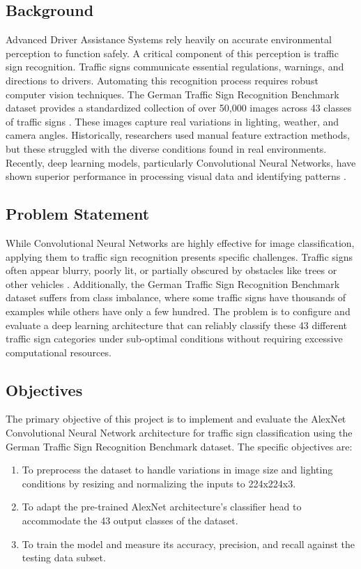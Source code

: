 \documentclass[conference]{IEEEtran}
\begin{document}
\subsection{Background}
Advanced Driver Assistance Systems rely heavily on accurate environmental perception to function safely. A critical component of this perception is traffic sign recognition. Traffic signs communicate essential regulations, warnings, and directions to drivers. Automating this recognition process requires robust computer vision techniques. The German Traffic Sign Recognition Benchmark dataset provides a standardized collection of over 50,000 images across 43 classes of traffic signs \cite{stallkamp2012man}. These images capture real variations in lighting, weather, and camera angles. Historically, researchers used manual feature extraction methods, but these struggled with the diverse conditions found in real environments. Recently, deep learning models, particularly Convolutional Neural Networks, have shown superior performance in processing visual data and identifying patterns \cite{sermanet2011traffic}. 

\subsection{Problem Statement}
While Convolutional Neural Networks are highly effective for image classification, applying them to traffic sign recognition presents specific challenges. Traffic signs often appear blurry, poorly lit, or partially obscured by obstacles like trees or other vehicles \cite{wali2019traffic}. Additionally, the German Traffic Sign Recognition Benchmark dataset suffers from class imbalance, where some traffic signs have thousands of examples while others have only a few hundred. The problem is to configure and evaluate a deep learning architecture that can reliably classify these 43 different traffic sign categories under sub-optimal conditions without requiring excessive computational resources.

\subsection{Objectives}
The primary objective of this project is to implement and evaluate the AlexNet Convolutional Neural Network architecture for traffic sign classification using the German Traffic Sign Recognition Benchmark dataset. The specific objectives are:
\begin{enumerate}
    \item To preprocess the dataset to handle variations in image size and lighting conditions by resizing and normalizing the inputs to 224x224x3.
    \item To adapt the pre-trained AlexNet architecture's classifier head to accommodate the 43 output classes of the dataset.
    \item To train the model and measure its accuracy, precision, and recall against the testing data subset.
\end{enumerate}
\end{document}
